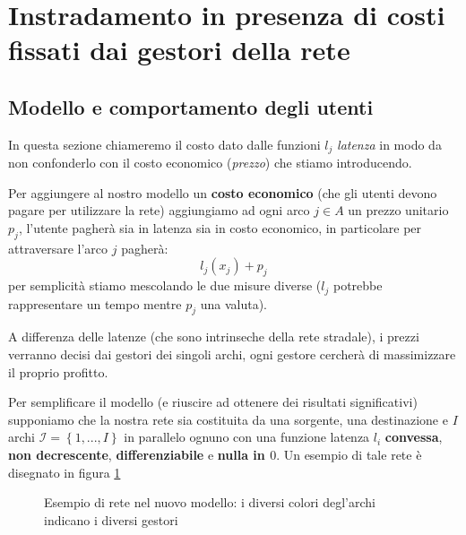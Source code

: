 \documentclass[a4paper]{article}
\theoremstyle{plain}
\theoremstyle{definition}
\theoremstyle{remark}
\newcommand{\set}[1]{\left\{#1\right\}}
\newcommand{\pa}[1]{\left(#1\right)}
\begin{document}
\section{Instradamento in presenza di costi fissati dai gestori della rete}

\subsection{Modello e comportamento degli utenti}
\label{sec:prezzi-modello}

In questa sezione chiameremo il costo dato dalle funzioni $l_j$
\textit{latenza} in modo da non confonderlo con il costo economico
(\textit{prezzo}) che stiamo introducendo.

Per aggiungere al nostro modello un \textbf{costo economico} (che gli
utenti devono pagare per utilizzare la rete) aggiungiamo ad ogni arco
$j\in A$ un prezzo unitario $p_j$, l'utente pagherà sia in latenza sia
in costo economico, in particolare per attraversare l'arco $j$
pagherà:
\[ l_j\pa{x_j} + p_j \]
per semplicità stiamo mescolando le due misure diverse ($l_j$ potrebbe
rappresentare un tempo mentre $p_j$ una valuta).

A differenza delle latenze (che sono intrinseche della rete stradale),
i prezzi verranno decisi dai gestori dei singoli archi, ogni gestore
cercherà di massimizzare il proprio profitto.

Per semplificare il modello (e riuscire ad ottenere dei risultati
significativi) supponiamo che la nostra rete sia costituita da una
sorgente, una destinazione e $I$ archi $\mathcal{I} = \set{1,...,I}$
in parallelo ognuno con una funzione latenza $l_i$ \textbf{convessa},
\textbf{non decrescente}, \textbf{differenziabile} e \textbf{nulla in
  $0$}. Un esempio di tale rete è disegnato in figura \ref{fig:provider}

\begin{figure}[ht]
  \centering
  \caption{Esempio di rete nel nuovo modello: i diversi colori
    degl'archi indicano i diversi gestori}
  \label{fig:provider}
\end{figure}
\end{document}
